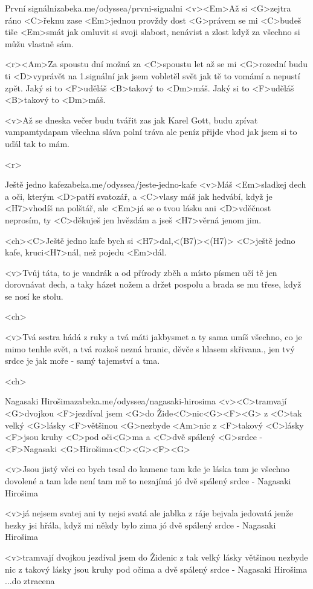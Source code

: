 \begin{song}[Chinaski]{7}{První signální}{zabeka.me/odyssea/prvni-signalni}
	<v><Em>Až si <G>zejtra ráno <C>řeknu zase
	<Em>jednou provždy dost
	<G>právem se mi <C>budeš tiše <Em>smát
	jak omluvit si svoji slabost, nenávist a zlost
	když za všechno si můžu vlastně sám.

	<r><Am>Za spoustu dní možná za <C>spoustu let
	až se mi <G>rozední budu ti <D>vyprávět
	na 1.signální jak jsem vobletěl svět
	jak tě to vomámí a nepustí zpět.
	Jaký si to <F>uděláš <B>takový to <Dm>máš.
	Jaký si to <F>uděláš <B>takový to <Dm>máš.

	<v>Až se dneska večer budu tvářit zas jak Karel Gott,
	budu zpívat vampamtydapam
	všechna sláva polní tráva ale peníz přijde vhod
	jak jsem si to uďál tak to mám.

	<r>
\end{song}
\begin{song}{8}{Ještě jedno kafe}{zabeka.me/odyssea/jeste-jedno-kafe}
	<v>Máš <Em>sladkej dech a oči, kterým <D>patří svatozář,
	a <C>vlasy máš jak hedvábí, když je <H7>vhodíš na polštář,
	ale <Em>já se o tvou lásku ani <D>vděčnost neprosím,
	ty <C>děkuješ jen hvězdám a jseš <H7>věrná jenom jim.

	<ch><C>Ještě jedno kafe bych si <H7>dal,<(B7)><(H7)>
	<C>ještě jedno kafe, kruci<H7>nál, než pojedu <Em>dál.

	<v>Tvůj táta, to je vandrák a od přírody zběh
	a místo písmen učí tě jen dorovnávat dech,
	a taky házet nožem a držet pospolu
	a brada se mu třese, když se nosí ke stolu.

	<ch>

	<v>Tvá sestra hádá z ruky a tvá máti jakbysmet
	a ty sama umíš všechno, co je mimo tenhle svět,
	a tvá rozkoš nezná hranic, děvče s hlasem skřivana.,
	jen tvý srdce je jak moře - samý tajemství a tma.

	<ch>
\end{song}
\begin{song}{9}{Nagasaki Hirošima}{zabeka.me/odyssea/nagasaki-hirosima}
	<v><C>tramvají <G>dvojkou <F>jezdíval jsem <G>do Žide<C>nic<G><F><G>
	z <C>tak velký <G>lásky <F>většinou <G>nezbyde <Am>nic
	z <F>takový <C>lásky <F>jsou kruhy <C>pod oči<G>ma
	a <C>dvě spálený <G>srdce - <F>Nagasaki <G>Hirošima<C><G><F><G>

	<v>Jsou jistý věci co bych tesal do kamene
	tam kde je láska tam je všechno dovolené
	a tam kde není tam mě to nezajímá
	jó dvě spálený srdce - Nagasaki Hirošima

	<v>já nejsem svatej ani ty nejsi svatá
	ale jablka z ráje bejvala jedovatá
	jenže hezky jsi hřála, když mi někdy bylo zima
	jó dvě spálený srdce - Nagasaki Hirošima

	<v>tramvají dvojkou jezdíval jsem do Židenic
	z tak velký lásky většinou nezbyde nic
	z takový lásky jsou kruhy pod očima
	a dvě spálený srdce - Nagasaki Hirošima ...do ztracena
\end{song}
